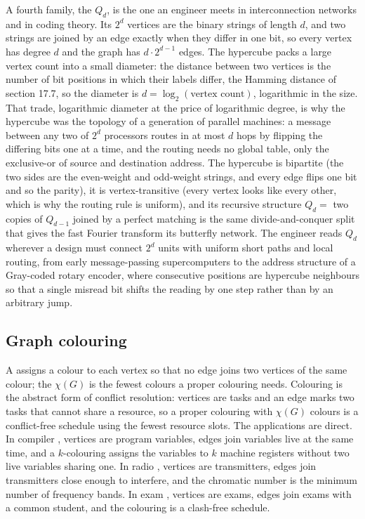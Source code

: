 A fourth family, the  $Q_{d}$, is the one an engineer
meets in interconnection networks and in coding theory. Its $2^{d}$
vertices are the binary strings of length $d$, and two strings are
joined by an edge exactly when they differ in one bit, so every vertex
has degree $d$ and the graph has $d \cdot 2^{d-1}$ edges. The hypercube
packs a large vertex count into a small diameter: the distance between
two vertices is the number of bit positions in which their labels
differ, the Hamming distance of section 17.7, so the diameter is $d =
\log_{2}(\text{vertex count})$, logarithmic in the size. That trade,
logarithmic diameter at the price of logarithmic degree, is why the
hypercube was the topology of a generation of parallel machines: a
message between any two of $2^{d}$ processors routes in at most $d$ hops
by flipping the differing bits one at a time, and the routing needs no
global table, only the exclusive-or of source and destination address.
The hypercube is bipartite (the two sides are the even-weight and
odd-weight strings, and every edge flips one bit and so the parity), it
is vertex-transitive (every vertex looks like every other, which is why
the routing rule is uniform), and its recursive structure $Q_{d} = $
two copies of $Q_{d-1}$ joined by a perfect matching is the same
divide-and-conquer split that gives the fast Fourier transform its
butterfly network. The engineer reads $Q_{d}$ wherever a design must
connect $2^{d}$ units with uniform short paths and local routing, from
early message-passing supercomputers to the address structure of a
Gray-coded rotary encoder, where consecutive positions are hypercube
neighbours so that a single misread bit shifts the reading by one step
rather than by an arbitrary jump.

\subsection{Graph colouring}

A  assigns a colour to each vertex
so that no edge joins two vertices of the same colour; the
 $\chi(G)$ is the fewest colours a proper
colouring needs. Colouring is the abstract form of conflict
resolution: vertices are tasks and an edge marks two tasks that
cannot share a resource, so a proper colouring with $\chi(G)$
colours is a conflict-free schedule using the fewest resource slots.
The applications are direct. In compiler , vertices are program variables, edges join variables
live at the same time, and a $k$-colouring assigns the variables to
$k$ machine registers without two live variables sharing one. In
radio , vertices are transmitters,
edges join transmitters close enough to interfere, and the
chromatic number is the minimum number of frequency bands. In exam
, vertices are exams, edges join exams with a
common student, and the colouring is a clash-free schedule.

